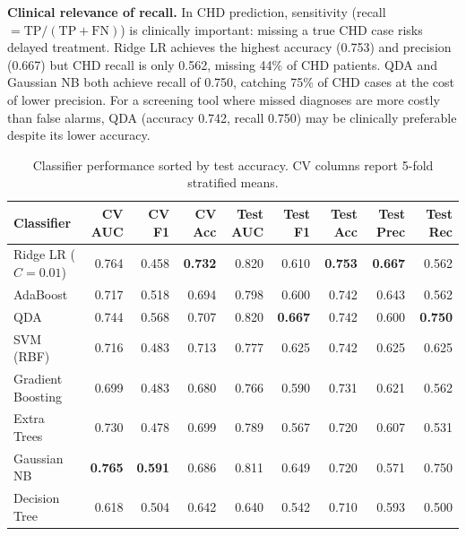 \documentclass[12pt,a4paper]{article}
\begin{document}
\vspace{8pt}
\noindent
\textbf{Clinical relevance of recall.}
In CHD prediction, sensitivity (recall $= \text{TP}/(\text{TP}+\text{FN})$)
is clinically important: missing a true CHD case risks delayed treatment.
Ridge LR achieves the highest accuracy (0.753) and precision (0.667) but
CHD recall is only 0.562, missing 44\% of CHD patients.
QDA and Gaussian NB both achieve recall of 0.750, catching 75\% of CHD
cases at the cost of lower precision. For a screening tool where missed
diagnoses are more costly than false alarms, QDA (accuracy 0.742,
recall 0.750) may be clinically preferable despite its lower accuracy.
\vspace{4pt}
\begin{table}[htbp]
\centering
\captionsetup{width=\linewidth}
\caption{\footnotesize Classifier performance sorted by test accuracy. CV columns report 5-fold stratified means.}
\label{tab:final}
\vspace{2pt}
{\footnotesize
\begin{tabular}{@{}lrrr|rrrrr@{}}
\toprule
Classifier & CV AUC & CV F1 & CV Acc & Test AUC & Test F1 & Test Acc & Test Prec & Test Rec \\
\midrule
\shortstack[l]{Ridge LR\\($C\!=\!0.01$)} & 0.764 & 0.458 & \textbf{0.732} & 0.820 & 0.610 & \textbf{0.753} & \textbf{0.667} & 0.562 \\[4pt]
AdaBoost          & 0.717 & 0.518 & 0.694 & 0.798 & 0.600 & 0.742 & 0.643 & 0.562 \\
QDA               & 0.744 & 0.568 & 0.707 & 0.820 & \textbf{0.667} & 0.742 & 0.600 & \textbf{0.750} \\
SVM (RBF)         & 0.716 & 0.483 & 0.713 & 0.777 & 0.625 & 0.742 & 0.625 & 0.625 \\
\shortstack[l]{Gradient\\Boosting} & 0.699 & 0.483 & 0.680 & 0.766 & 0.590 & 0.731 & 0.621 & 0.562 \\[4pt]
\shortstack[l]{Extra\\Trees} & 0.730 & 0.478 & 0.699 & 0.789 & 0.567 & 0.720 & 0.607 & 0.531 \\[4pt]
\shortstack[l]{Gaussian\\NB} & \textbf{0.765} & \textbf{0.591} & 0.686 & 0.811 & 0.649 & 0.720 & 0.571 & 0.750 \\[4pt]
\shortstack[l]{Decision\\Tree} & 0.618 & 0.504 & 0.642 & 0.640 & 0.542 & 0.710 & 0.593 & 0.500 \\[4pt]

\end{tabular}}
\end{table}
\end{document}
